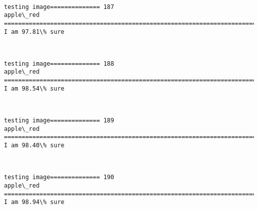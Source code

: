 \documentclass[11pt]{article}
\begin{document}
    \begin{center}
    \end{center}
    { \hspace*{\fill} \\}
    
    \begin{Verbatim}[commandchars=\\\{\}]
testing image============== 187
apple\_red
============================================================================
I am 97.81\% sure

    \end{Verbatim}

    \begin{center}
    \end{center}
    { \hspace*{\fill} \\}
    
    \begin{Verbatim}[commandchars=\\\{\}]
testing image============== 188
apple\_red
============================================================================
I am 98.54\% sure

    \end{Verbatim}

    \begin{center}
    \end{center}
    { \hspace*{\fill} \\}
    
    \begin{Verbatim}[commandchars=\\\{\}]
testing image============== 189
apple\_red
============================================================================
I am 98.40\% sure

    \end{Verbatim}

    \begin{center}
    \end{center}
    { \hspace*{\fill} \\}
    
    \begin{Verbatim}[commandchars=\\\{\}]
testing image============== 190
apple\_red
============================================================================
I am 98.94\% sure

    \end{Verbatim}
\end{document}
